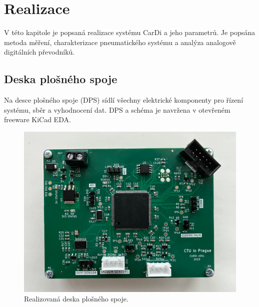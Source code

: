 \chapter{Realizace}
V této kapitole je popsaná realizace systému CarDi a jeho parametrů. Je popsána metoda měření, charakterizace pneumatického systému a analýza analogově digitálních převodníků.

\section{Deska plošného spoje}
Na desce plošného spoje (DPS) sídlí všechny elektrické komponenty pro řízení systému, sběr a vyhodnocení dat. DPS a schéma je navržena v otevřeném freeware KiCad EDA.
\begin{figure}[H]
    \includegraphics[width=1\linewidth]{pictures/pcb_full.jpg}
    \caption{Realizovaná deska plošného spoje.}
    \label{fig:pcb_full}
\end{figure}

